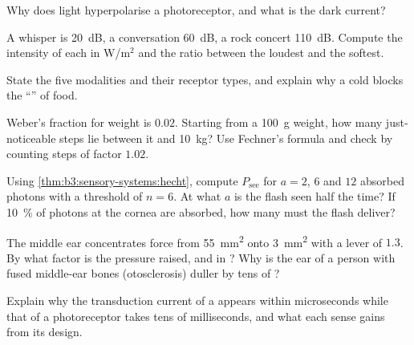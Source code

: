 \begin{exercise}[$\star$]\label{exo:b3:sensory-systems:2}
Why does light hyperpolarise a photoreceptor, and what is the dark
current?
\end{exercise}

\begin{exercise}[$\star$]\label{exo:b3:sensory-systems:3}
A whisper is \qty{20}{dB}, a conversation \qty{60}{dB}, a rock concert
\qty{110}{dB}. Compute the intensity of each in W/m$^{2}$ and the
ratio between the loudest and the softest.
\end{exercise}

\begin{exercise}[$\star$]\label{exo:b3:sensory-systems:4}
State the five  modalities and their receptor types, and explain
why a cold blocks the ``'' of food.
\end{exercise}

\begin{exercise}[$\star\star$]\label{exo:b3:sensory-systems:5}
Weber's fraction for weight is $0.02$. Starting from a \qty{100}{g}
weight, how many just-noticeable steps lie between it and
\qty{10}{kg}? Use Fechner's formula and check by counting steps of
factor $1.02$.
\end{exercise}

\begin{exercise}[$\star\star$]\label{exo:b3:sensory-systems:6}
Using \cref{thm:b3:sensory-systems:hecht}, compute $P_{\text{see}}$ for
$a = 2$, $6$ and $12$ absorbed photons with a threshold of $n = 6$.
At what $a$ is the flash seen half the time? If \qty{10}{\%} of photons
at the cornea are absorbed, how many must the flash deliver?
\end{exercise}

\begin{exercise}[$\star\star$]\label{exo:b3:sensory-systems:7}
The middle ear concentrates force from \qty{55}{mm^2} onto
\qty{3}{mm^2} with a lever of $1.3$. By what factor is the pressure
raised, and in ? Why is the ear of a person with fused
middle-ear bones (otosclerosis) duller by tens of ?
\end{exercise}

\begin{exercise}[$\star\star$]\label{exo:b3:sensory-systems:8}
Explain why the transduction current of a  appears within
microseconds while that of a photoreceptor takes tens of
milliseconds, and what each sense gains from its design.
\end{exercise}

